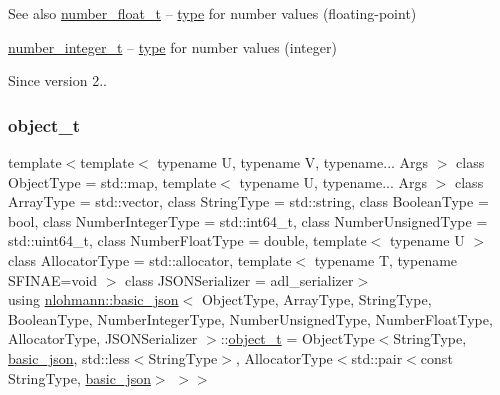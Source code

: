 \begin{DoxySeeAlso}{See also}
\mbox{\hyperlink{classnlohmann_1_1basic__json_a88d6103cb3620410b35200ee8e313d97}{number\+\_\+float\+\_\+t}} -- \mbox{\hyperlink{classnlohmann_1_1basic__json_a2b2d781d7f2a4ee41bc0016e931cadf7}{type}} for number values (floating-\/point) 

\mbox{\hyperlink{classnlohmann_1_1basic__json_a98e611d67b7bd75307de99c9358ab2dc}{number\+\_\+integer\+\_\+t}} -- \mbox{\hyperlink{classnlohmann_1_1basic__json_a2b2d781d7f2a4ee41bc0016e931cadf7}{type}} for number values (integer)
\end{DoxySeeAlso}
\begin{DoxySince}{Since}
version 2.. 
\end{DoxySince}
\mbox{\label{classnlohmann_1_1basic__json_aa1eb13d5aa86f80cbee6c58e90fbaf49}} 
\subsubsection{\texorpdfstring{object\_t}{object\_t}}
{\footnotesize\ttfamily template$<$template$<$ typename U, typename V, typename... Args $>$ class Object\+Type = std\+::map, template$<$ typename U, typename... Args $>$ class Array\+Type = std\+::vector, class String\+Type  = std\+::string, class Boolean\+Type  = bool, class Number\+Integer\+Type  = std\+::int64\+\_\+t, class Number\+Unsigned\+Type  = std\+::uint64\+\_\+t, class Number\+Float\+Type  = double, template$<$ typename U $>$ class Allocator\+Type = std\+::allocator, template$<$ typename T, typename S\+F\+I\+N\+A\+E=void $>$ class J\+S\+O\+N\+Serializer = adl\+\_\+serializer$>$ \\
using \mbox{\hyperlink{classnlohmann_1_1basic__json}{nlohmann\+::basic\+\_\+json}}$<$ Object\+Type, Array\+Type, String\+Type, Boolean\+Type, Number\+Integer\+Type, Number\+Unsigned\+Type, Number\+Float\+Type, Allocator\+Type, J\+S\+O\+N\+Serializer $>$\+::\mbox{\hyperlink{classnlohmann_1_1basic__json_aa1eb13d5aa86f80cbee6c58e90fbaf49}{object\+\_\+t}} =  Object\+Type$<$String\+Type, \mbox{\hyperlink{classnlohmann_1_1basic__json}{basic\+\_\+json}}, std\+::less$<$String\+Type$>$, Allocator\+Type$<$std\+::pair$<$const String\+Type, \mbox{\hyperlink{classnlohmann_1_1basic__json}{basic\+\_\+json}}$>$ $>$$>$}



